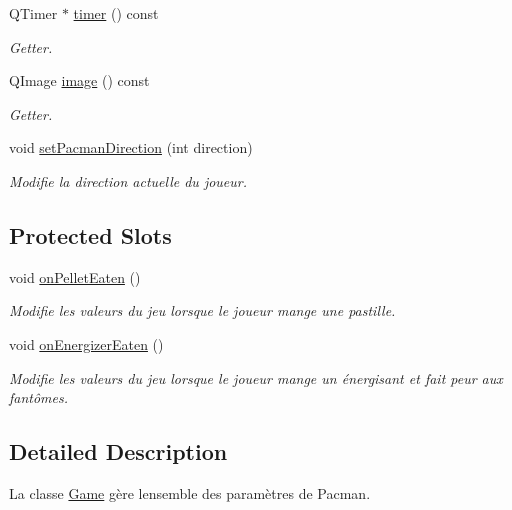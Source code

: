 \begin{DoxyCompactItemize}
Q\+Timer $\ast$ \hyperlink{class_game_a8c93ee78acb3dc311aaf5b7bae06e70c}{timer} () const 
\begin{DoxyCompactList}\small\item\em Getter. \end{DoxyCompactList}\item 
Q\+Image \hyperlink{class_game_a355b625103201150c07114b4b2fccb03}{image} () const 
\begin{DoxyCompactList}\small\item\em Getter. \end{DoxyCompactList}\item 
void \hyperlink{class_game_aa9db7117b627f79bac876506fa6733d3}{set\+Pacman\+Direction} (int direction)
\begin{DoxyCompactList}\small\item\em Modifie la direction actuelle du joueur. \end{DoxyCompactList}\end{DoxyCompactItemize}
\subsection*{Protected Slots}
\begin{DoxyCompactItemize}
\item 
\hypertarget{class_game_afaad4867b30abbd7005f336c9f270986}{}void \hyperlink{class_game_afaad4867b30abbd7005f336c9f270986}{on\+Pellet\+Eaten} ()\label{class_game_afaad4867b30abbd7005f336c9f270986}

\begin{DoxyCompactList}\small\item\em Modifie les valeurs du jeu lorsque le joueur mange une pastille. \end{DoxyCompactList}\item 
\hypertarget{class_game_ad3a2fed489f6bb930e3a88785ddf8c9d}{}void \hyperlink{class_game_ad3a2fed489f6bb930e3a88785ddf8c9d}{on\+Energizer\+Eaten} ()\label{class_game_ad3a2fed489f6bb930e3a88785ddf8c9d}

\begin{DoxyCompactList}\small\item\em Modifie les valeurs du jeu lorsque le joueur mange un énergisant et fait peur aux fantômes. \end{DoxyCompactList}\end{DoxyCompactItemize}


\subsection{Detailed Description}
La classe \hyperlink{class_game}{Game} gère l\textquotesingle{}ensemble des paramètres de Pacman. 

